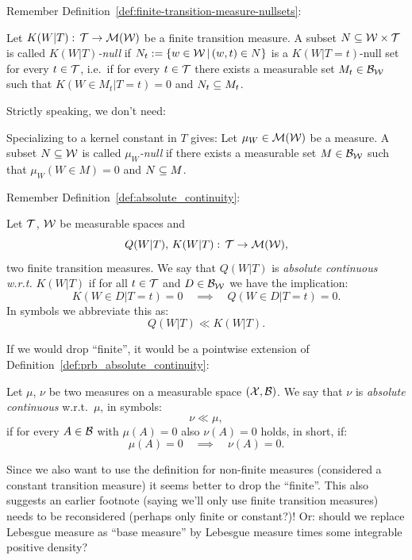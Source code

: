 Remember Definition~\ref{def:finite-transition-measure-nullsets}:
\begin{Def}
Let $K(W|T):\, \mathcal{T} \to \mathcal{M}(\mathcal{W})$ be a finite transition measure.
A subset $N \subseteq \mathcal{W} \times \mathcal{T}$ is called \emph{$K(W|T)$-null} if 
$N_t:=\{ w \in \mathcal{W}\,|\, (w,t) \in N \}$ is a $K(W|T=t)$-null set for every $t \in \mathcal{T}$, i.e.\
if for every $t \in \mathcal{T}$ there exists a measurable set $M_t \in \mathcal{B}_{\mathcal{W}}$ such that $K(W \in M_t|T=t) =0$ 
and $N_t \subseteq M_t$.
\end{Def}
Strictly speaking, we don't need:
\begin{Rem}
  Specializing to a kernel constant in $T$ gives:
  Let $\mu_W \in \mathcal{M}(\mathcal{W})$ be a measure.
  A subset $N \subseteq \mathcal{W}$ is called \emph{$\mu_W$-null} if there exists a measurable set $M \in \mathcal{B}_{\mathcal{W}}$ such that $\mu_W(W \in M) = 0$ and $N \subseteq M$.
\end{Rem}
Remember Definition~\ref{def:absolute_continuity}:
\begin{Def}
    Let $\mathcal{T}$, $\mathcal{W}$ be  measurable spaces and
    \[ Q(W|T),\,K(W|T):\, \mathcal{T} \to \mathcal{M}(\mathcal{W}),  \]
    two finite transition measures. 
    We say that $Q(W|T)$ is \emph{absolute continuous w.r.t.} $K(W|T)$ if for all $t \in \mathcal{T}$ and $D \in \mathcal{B}_{\mathcal{W}}$ 
    we have the implication:
    \[ K(W \in D|T=t) =0 \quad \implies \quad Q(W \in D|T=t) =0.  \]
    In symbols we abbreviate this as:
    \[  Q(W|T) \ll K(W|T).\]
\end{Def}
If we would drop ``finite'', it would be a pointwise extension of Definition~\ref{def:prb_absolute_continuity}:
\begin{Def}
    Let $\mu$, $\nu$ be two measures on a measurable space $(\mathcal{X},\mathcal{B})$.
    We say that $\nu$ is \emph{absolute continuous} w.r.t.\ $\mu$, in symbols:
    \[ \nu \ll \mu,\]
    if for every $A \in \mathcal{B}$ with $\mu(A)=0$ also $\nu(A)=0$ holds, in short, if:
    \[ \mu(A)=0 \quad \implies \quad \nu(A)=0.\]
\end{Def}
Since we also want to use the definition for non-finite measures (considered a constant transition measure) it seems better to drop the ``finite''.
This also suggests an earlier footnote (saying we'll only use finite transition measures) needs to be reconsidered (perhaps only finite or constant?)!
Or: should we replace Lebesgue measure as ``base measure'' by Lebesgue measure times some integrable positive density?

